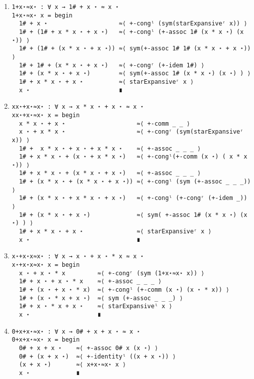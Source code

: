 \begin{enumerate}
\item
\begin{verbatim}
1+x⋆≈x⋆ : ∀ x → 1# + x ⋆ ≈ x ⋆
1+x⋆≈x⋆ x = begin
  1# + x ⋆                    ≈⟨ +-congˡ (sym(starExpansiveʳ x)) ⟩ 
  1# + (1# + x * x ⋆ + x ⋆)   ≈⟨ +-congˡ (+-assoc 1# (x * x ⋆) (x ⋆)) ⟩ 
  1# + (1# + (x * x ⋆ + x ⋆)) ≈⟨ sym(+-assoc 1# 1# (x * x ⋆ + x ⋆)) ⟩ 
  1# + 1# + (x * x ⋆ + x ⋆)   ≈⟨ +-congʳ (+-idem 1#) ⟩ 
  1# + (x * x ⋆ + x ⋆)        ≈⟨ sym(+-assoc 1# (x * x ⋆) (x ⋆) ) ⟩ 
  1# + x * x ⋆ + x ⋆          ≈⟨ starExpansiveʳ x ⟩ 
  x ⋆                         ∎
\end{verbatim}
\item
\begin{verbatim}
xx⋆+x⋆≈x⋆ : ∀ x → x * x ⋆ + x ⋆ ≈ x ⋆
xx⋆+x⋆≈x⋆ x = begin
  x * x ⋆ + x ⋆                    ≈⟨ +-comm _ _ ⟩ 
  x ⋆ + x * x ⋆                    ≈⟨ +-congʳ (sym(starExpansiveʳ x)) ⟩
  1# +  x * x ⋆ + x ⋆ + x * x ⋆    ≈⟨ +-assoc _ _ _ ⟩ 
  1# + x * x ⋆ + (x ⋆ + x * x ⋆)   ≈⟨ +-congˡ(+-comm (x ⋆) ( x * x ⋆)) ⟩
  1# + x * x ⋆ + (x * x ⋆ + x ⋆)   ≈⟨ +-assoc _ _ _ ⟩ 
  1# + (x * x ⋆ + (x * x ⋆ + x ⋆)) ≈⟨ +-congˡ (sym (+-assoc _ _ _)) ⟩ 
  1# + (x * x ⋆ + x * x ⋆ + x ⋆)   ≈⟨ +-congˡ (+-congʳ (+-idem _)) ⟩ 
  1# + (x * x ⋆ + x ⋆)             ≈⟨ sym( +-assoc 1# (x * x ⋆) (x ⋆) ) ⟩ 
  1# + x * x ⋆ + x ⋆               ≈⟨ starExpansiveʳ x ⟩ 
  x ⋆                              ∎
\end{verbatim}
\item
\begin{verbatim}
x⋆+x⋆x≈x⋆ : ∀ x → x ⋆ + x ⋆ * x ≈ x ⋆
x⋆+x⋆x≈x⋆ x = begin
  x ⋆ + x ⋆ * x         ≈⟨ +-congʳ (sym (1+x⋆≈x⋆ x)) ⟩
  1# + x ⋆ + x ⋆ * x    ≈⟨ +-assoc _ _ _ ⟩
  1# + (x ⋆ + x ⋆ * x)  ≈⟨ +-congˡ (+-comm (x ⋆) (x ⋆ * x)) ⟩  
  1# + (x ⋆ * x + x ⋆)  ≈⟨ sym (+-assoc _ _ _) ⟩
  1# + x ⋆ * x + x ⋆    ≈⟨ starExpansiveˡ x ⟩ 
  x ⋆                   ∎
\end{verbatim}
\item
\begin{verbatim}
0+x+x⋆≈x⋆ : ∀ x → 0# + x + x ⋆ ≈ x ⋆
0+x+x⋆≈x⋆ x = begin
  0# + x + x ⋆    ≈⟨ +-assoc 0# x (x ⋆) ⟩
  0# + (x + x ⋆)  ≈⟨ +-identityˡ ((x + x ⋆)) ⟩
  (x + x ⋆)       ≈⟨ x+x⋆≈x⋆ x ⟩
  x ⋆             ∎


\end{verbatim}
\end{enumerate}
